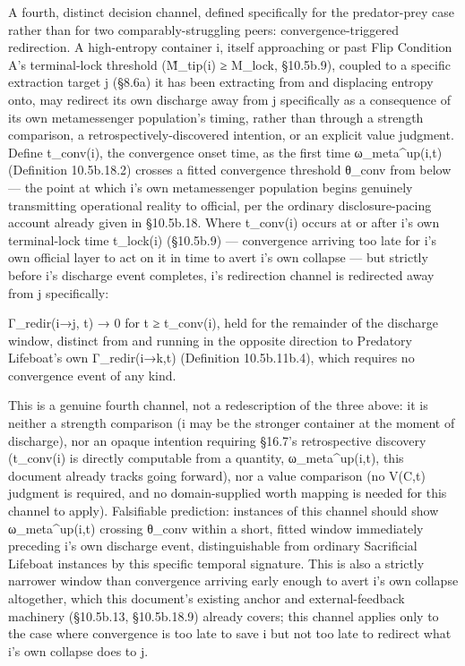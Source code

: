 \documentclass[
]{article}
\begin{document}
A fourth, distinct decision channel, defined specifically for the
predator-prey case rather than for two comparably-struggling peers:
convergence-triggered redirection. A high-entropy container i, itself
approaching or past Flip Condition A's terminal-lock threshold
(M̃\_tip(i) ≥ M\_lock, §10.5b.9), coupled to a specific extraction target
j (§8.6a) it has been extracting from and displacing entropy onto, may
redirect its own discharge away from j specifically as a consequence of
its own metamessenger population's timing, rather than through a
strength comparison, a retrospectively-discovered intention, or an
explicit value judgment. Define t\_conv(i), the convergence onset time,
as the first time ω\_meta\^{}up(i,t) (Definition 10.5b.18.2) crosses a
fitted convergence threshold θ\_conv from below --- the point at which
i's own metamessenger population begins genuinely transmitting
operational reality to official, per the ordinary disclosure-pacing
account already given in §10.5b.18. Where t\_conv(i) occurs at or after
i's own terminal-lock time t\_lock(i) (§10.5b.9) --- convergence
arriving too late for i's own official layer to act on it in time to
avert i's own collapse --- but strictly before i's discharge event
completes, i's redirection channel is redirected away from j
specifically:

Γ\_redir(i→j, t) → 0 for t ≥ t\_conv(i), held for the remainder of the
discharge window, distinct from and running in the opposite direction to
Predatory Lifeboat's own Γ\_redir(i→k,t) (Definition 10.5b.11b.4), which
requires no convergence event of any kind.

This is a genuine fourth channel, not a redescription of the three
above: it is neither a strength comparison (i may be the stronger
container at the moment of discharge), nor an opaque intention requiring
§16.7's retrospective discovery (t\_conv(i) is directly computable from
a quantity, ω\_meta\^{}up(i,t), this document already tracks going
forward), nor a value comparison (no V(C,t) judgment is required, and no
domain-supplied worth mapping is needed for this channel to apply).
Falsifiable prediction: instances of this channel should show
ω\_meta\^{}up(i,t) crossing θ\_conv within a short, fitted window
immediately preceding i's own discharge event, distinguishable from
ordinary Sacrificial Lifeboat instances by this specific temporal
signature. This is also a strictly narrower window than convergence
arriving early enough to avert i's own collapse altogether, which this
document's existing anchor and external-feedback machinery (§10.5b.13,
§10.5b.18.9) already covers; this channel applies only to the case where
convergence is too late to save i but not too late to redirect what i's
own collapse does to j.
\end{document}
